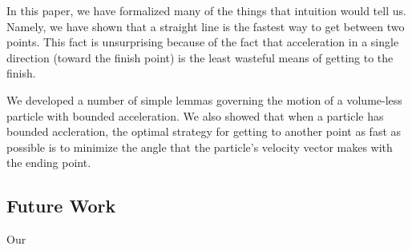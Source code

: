 In this paper, we have formalized many of the things that intuition would tell us. Namely, we have shown that a straight line is the fastest way to get between two points. This fact is unsurprising because of the fact that acceleration in a single direction (toward the finish point) is the least wasteful means of getting to the finish.

We developed a number of simple lemmas governing the motion of a volume-less particle with bounded acceleration. We also showed that when a particle has bounded accleration, the optimal strategy for getting to another point as fast as possible is to minimize the angle that the particle's velocity vector makes with the ending point.

\subsection{Future Work}

Our 

